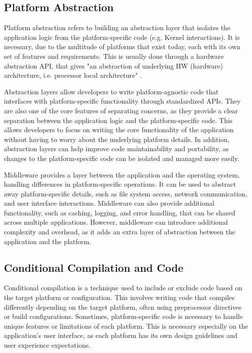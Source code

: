 \subsection{Platform Abstraction}
Platform abstraction refers to building an abstraction layer that isolates the application logic from the platform-specific code (e.g. Kernel interactions).
It is necessary, due to the multitude of platforms that exist today, each with its own set of features and requirements.
This is usually done through a hardware abstraction API, 
that gives "an abstraction of underlying HW (hardware) architecture, i.e. processor local architecture" \cite{platformAbstraction}.

\par
Abstraction layers allow developers to write platform-agnostic code that interfaces with platform-specific functionality through standardized APIs.
They are also one of the core features of separating concerns, as they provide a clear separation between the application logic and the platform-specific code.
This allows developers to focus on writing the core functionality of the application without having to worry about the underlying platform details.
In addition, abstraction layers can help improve code maintainability and portability, as changes to the platform-specific code can be isolated and managed more easily.

\par
Middleware provides a layer between the application and the operating system, handling differences in platform-specific operations.
It can be used to abstract away platform-specific details, such as file system access, network communication, and user interface interactions.
Middleware can also provide additional functionality, such as caching, logging, and error handling, that can be shared across multiple applications.
However, middleware can introduce additional complexity and overhead, as it adds an extra layer of abstraction between the application and the platform.

\subsection{Conditional Compilation and Code}
Conditional compilation is a technique used to include or exclude code based on the target platform or configuration.
This involves writing code that compiles differently depending on the target platform, often using preprocessor directives or build configurations.
Sometimes, platform-specific code is necessary to handle unique features or limitations of each platform.
This is necessary especially on the application's user interface, as each platform has its own design guidelines and user experience expectations.



